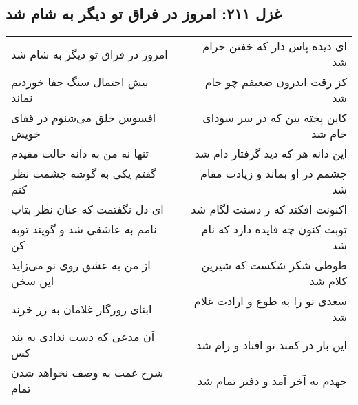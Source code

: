 \begin{center}
\section*{غزل ۲۱۱: امروز در فراق تو دیگر به شام شد}
\label{sec:211}
\begin{longtable}{l p{0.5cm} r}
امروز در فراق تو دیگر به شام شد
&&
ای دیده پاس دار که خفتن حرام شد
\\
بیش احتمال سنگ جفا خوردنم نماند
&&
کز رقت اندرون ضعیفم چو جام شد
\\
افسوس خلق می‌شنوم در قفای خویش
&&
کاین پخته بین که در سر سودای خام شد
\\
تنها نه من به دانه خالت مقیدم
&&
این دانه هر که دید گرفتار دام شد
\\
گفتم یکی به گوشه چشمت نظر کنم
&&
چشمم در او بماند و زیادت مقام شد
\\
ای دل نگفتمت که عنان نظر بتاب
&&
اکنونت افکند که ز دستت لگام شد
\\
نامم به عاشقی شد و گویند توبه کن
&&
توبت کنون چه فایده دارد که نام شد
\\
از من به عشق روی تو می‌زاید این سخن
&&
طوطی شکر شکست که شیرین کلام شد
\\
ابنای روزگار غلامان به زر خرند
&&
سعدی تو را به طوع و ارادت غلام شد
\\
آن مدعی که دست ندادی به بند کس
&&
این بار در کمند تو افتاد و رام شد
\\
شرح غمت به وصف نخواهد شدن تمام
&&
جهدم به آخر آمد و دفتر تمام شد
\\
\end{longtable}
\end{center}
